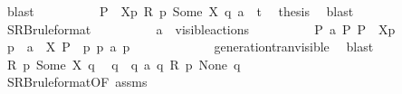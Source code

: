 \begin{isabellebody}
\ blast\isanewline
\ \ \ \ \ \ \ \ \isamarkupfalse%
\ {\isacartoucheopen}P{\isacharprime}{\kern0pt}\ {\isacharequal}{\kern0pt}\ {\isasymtheta}{\isacharbrackleft}{\kern0pt}X{\isacharbrackright}{\kern0pt}{\isacharparenleft}{\kern0pt}p{\isacharprime}{\kern0pt}{\isacharparenright}{\kern0pt}{\isacartoucheclose}\ {\isacartoucheopen}R\ p{\isacharprime}{\kern0pt}\ {\isacharparenleft}{\kern0pt}Some\ X{\isacharparenright}{\kern0pt}\ q{\isacharprime}{\kern0pt}{\isacartoucheclose}\ {\isacartoucheopen}a\ {\isacharequal}{\kern0pt}\ t{\isacartoucheclose}\ \isamarkupfalse%
\ {\isacharquery}{\kern0pt}thesis\ \isamarkupfalse%
\ blast\isanewline
\ \ \ \ \ \ \isamarkupfalse%
\isanewline
\ \ \ \ \ \ \ \ \isamarkupfalse%
\ SRB{\isacharunderscore}{\kern0pt}ruleformat\isanewline
\ \ \ \ \ \ \ \ \isamarkupfalse%
\ {\isacartoucheopen}a\ {\isasymin}\ visible{\isacharunderscore}{\kern0pt}actions{\isacartoucheclose}\isanewline
\ \ \ \ \ \ \ \ \isamarkupfalse%
\ {\isacartoucheopen}P\ {\isasymlongmapsto}\isactrlsup {\isasymtheta}a\ P{\isacharprime}{\kern0pt}{\isacartoucheclose}\ {\isacartoucheopen}P\ {\isacharequal}{\kern0pt}\ {\isasymtheta}{\isacharbrackleft}{\kern0pt}X{\isacharbrackright}{\kern0pt}{\isacharparenleft}{\kern0pt}p{\isacharparenright}{\kern0pt}{\isacartoucheclose}\ \isamarkupfalse%
\ p{\isacharprime}{\kern0pt}\ \ {\isacartoucheopen}a\ {\isasymin}\ X{\isacartoucheclose}\ {\isacartoucheopen}P{\isacharprime}{\kern0pt}\ {\isacharequal}{\kern0pt}\ {\isasymtheta}{\isacharparenleft}{\kern0pt}p{\isacharprime}{\kern0pt}{\isacharparenright}{\kern0pt}{\isacartoucheclose}\ {\isacartoucheopen}p\ {\isasymlongmapsto}a\ p{\isacharprime}{\kern0pt}{\isacartoucheclose}\ \isanewline
\ \ \ \ \ \ \ \ \ \ \isamarkupfalse%
\ generation{\isacharunderscore}{\kern0pt}tran{\isacharunderscore}{\kern0pt}visible\ \isamarkupfalse%
\ blast\isanewline
\ \ \ \ \ \ \ \ \isamarkupfalse%
\ {\isacartoucheopen}R\ p\ {\isacharparenleft}{\kern0pt}Some\ X{\isacharparenright}{\kern0pt}\ q{\isacartoucheclose}\ \isamarkupfalse%
\ q{\isacharprime}{\kern0pt}\ \ {\isacartoucheopen}q\ {\isasymlongmapsto}a\ q{\isacharprime}{\kern0pt}{\isacartoucheclose}\ {\isacartoucheopen}R\ p{\isacharprime}{\kern0pt}\ None\ q{\isacharprime}{\kern0pt}{\isacartoucheclose}\isanewline
\ \ \ \ \ \ \ \ \ \ \isamarkupfalse%
\ SRB{\isacharunderscore}{\kern0pt}ruleformat{\isacharparenleft}{\kern0pt}{}{\isacharparenright}{\kern0pt}{\isacharbrackleft}{\kern0pt}OF\ assms{\isacharparenleft}{\kern0pt}{}{\isacharparenright}{\kern0pt}{\isacharbrackright}{\kern0pt}\ \isamarkupfalse%

\end{isabellebody}
